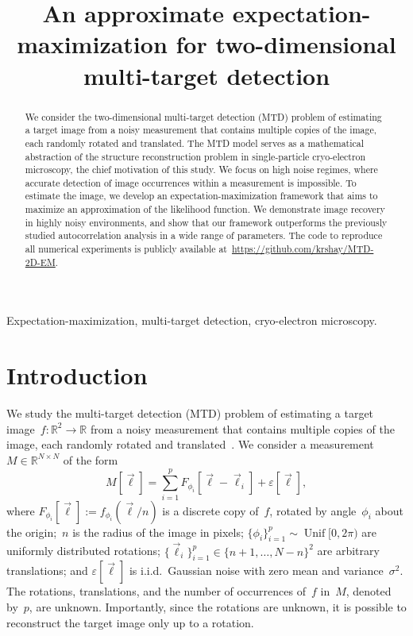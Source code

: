 \documentclass{article}
\title{An approximate expectation-maximization for two-dimensional multi-target detection}
\DeclareMathOperator{\Unif}{Unif}
\begin{document}
\ninept
\setlength{\abovedisplayskip}{3pt}
\setlength{\belowdisplayskip}{3pt}
%
\maketitle
%
\begin{abstract}
We consider the two-dimensional multi-target detection (MTD) problem of estimating a target image from a noisy measurement that contains multiple copies of the image, each randomly rotated and translated. The MTD model serves as a mathematical abstraction of the structure reconstruction problem in single-particle cryo-electron microscopy, the chief motivation of this study. We focus on high noise regimes, where accurate detection of image occurrences within a measurement is impossible. To estimate the image, we develop an  expectation-maximization framework that aims to maximize an approximation of the  likelihood function. We demonstrate image recovery in highly noisy environments, and show that our framework outperforms the previously studied autocorrelation analysis in a wide range of parameters. The code to reproduce all numerical experiments is publicly available at~\url{https://github.com/krshay/MTD-2D-EM}.
\end{abstract}
%
\begin{keywords}
Expectation-maximization, multi-target detection, cryo-electron microscopy.
\end{keywords}
%

\section{Introduction}
\label{sec:introduction}
We study the multi-target detection (MTD) problem of estimating a target image~\mbox{$f:\mathbb{R}^2 \rightarrow \mathbb{R}$} from a noisy measurement that contains multiple copies of the image, each randomly rotated and translated~\cite{bendory2019multi, lan2020multi, marshall2020image, bendory2021multi, kreymer2021two, shalit2021generalized, bendory2018toward}. We consider a measurement~$M \in \mathbb{R}^{N \times N}$ of the form
\begin{equation}
\label{eq:model}
M[\vec{\ell}] = \sum_{i=1}^{p} F_{\phi_i}[\vec{\ell} - \vec{\ell}_i] + \varepsilon[\vec{\ell}],
\end{equation}
where \mbox{$F_{\phi_i} [\vec{\ell}] := f_{\phi_i} (\vec{\ell} / n)$} is a discrete copy of~$f$, rotated by angle~$\phi_i$ about the origin;~$n$ is the radius of the image in pixels; \mbox{$\{\phi_i\}_{i=1}^{p} \sim \Unif[0, 2\pi)$} are uniformly distributed rotations; \mbox{$\{\vec{\ell}_i\}_{i=1}^{p} \in \{n + 1, \ldots, N-n\}^2$} are arbitrary translations;  and $\varepsilon[\vec{\ell}]$ is i.i.d.\ Gaussian noise with zero mean and \mbox{variance~$\sigma^2$}. The rotations, translations, and the number of occurrences of~$f$ in~$M$, denoted by~$p$, are unknown. Importantly, since the rotations are unknown, it is possible to reconstruct the target image only up to a rotation.
\end{document}
